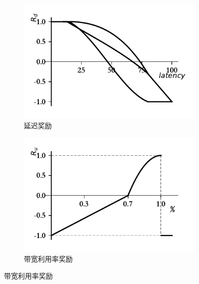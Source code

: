 \begin{figure}[ht]
\centering
\begin{subfigure}[t]{0.4\linewidth}
  \centering
  \includegraphics[width=\linewidth]{figures/chap03/reward_function/Rd.pdf}
  \caption{延迟奖励}
  \label{fig:Latency Reward}
\end{subfigure}%
\hspace{0.05\linewidth} %
\begin{subfigure}[t]{0.4\linewidth}
  \centering
  \includegraphics[width=\linewidth]{figures/chap03/reward_function/Ru.pdf}
  \caption{带宽利用率奖励}
  \label{fig:Bandwidth Utilization Reward}
\end{subfigure}


\end{figure}
